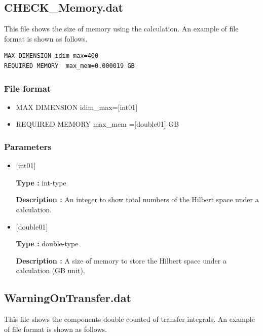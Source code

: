 \newpage
\subsection{CHECK\_Memory.dat}
This file shows the size of memory using the calculation.
An example of file format is shown as follows.

\begin{minipage}{12.5cm}
\begin{screen}
\begin{verbatim}
MAX DIMENSION idim_max=400 
REQUIRED MEMORY  max_mem=0.000019 GB 
\end{verbatim}
\end{screen}
\end{minipage}

\subsubsection{File format}
 \begin{itemize}
   \item  MAX DIMENSION idim\_max=$[$int01$]$
   \item  REQUIRED MEMORY  max\_mem =$[$double01$]$ GB 
 \end{itemize}
 
\subsubsection{Parameters}
 \begin{itemize}

    \item  $[$int01$]$ 
   
    {\bf Type :} int-type

   {\bf Description :} An integer to show total numbers of the Hilbert space under a calculation.
      
   \item  $[$double01$]$
   
    {\bf Type :} double-type

    {\bf Description :}  
    A size of memory to store the Hilbert space under a calculation (GB unit).
 
\end{itemize}

\newpage
\subsection{WarningOnTransfer.dat}
This file shows the components double counted of transfer integrals.
An example of file format is shown as follows.

